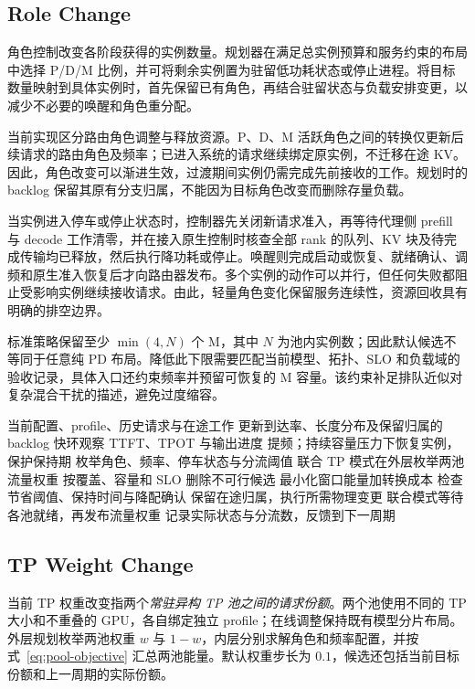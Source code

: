 \subsection{Role Change}
角色控制改变各阶段获得的实例数量。规划器在满足总实例预算和服务约束的布局中选择 P/D/M 比例，并可将剩余实例置为驻留低功耗状态或停止进程。将目标数量映射到具体实例时，首先保留已有角色，再结合驻留状态与负载安排变更，以减少不必要的唤醒和角色重分配。

当前实现区分路由角色调整与释放资源。P、D、M 活跃角色之间的转换仅更新后续请求的路由角色及频率；已进入系统的请求继续绑定原实例，不迁移在途 KV。因此，角色改变可以渐进生效，过渡期间实例仍需完成先前接收的工作。规划时的 backlog 保留其原有分支归属，不能因为目标角色改变而删除存量负载。

当实例进入停车或停止状态时，控制器先关闭新请求准入，再等待代理侧 prefill 与 decode 工作清零，并在接入原生控制时核查全部 rank 的队列、KV 块及待完成传输均已释放，然后执行降功耗或停止。唤醒则完成启动或恢复、就绪确认、调频和原生准入恢复后才向路由器发布。多个实例的动作可以并行，但任何失败都阻止受影响实例继续接收请求。由此，轻量角色变化保留服务连续性，资源回收具有明确的排空边界。

标准策略保留至少 $\min(4,N)$ 个 M，其中 $N$ 为池内实例数；因此默认候选不等同于任意纯 PD 布局。降低此下限需要匹配当前模型、拓扑、SLO 和负载域的验收记录，具体入口还约束频率并预留可恢复的 M 容量。该约束补足排队近似对复杂混合干扰的描述，避免过度缩容。

\begin{algorithm}[t]
\caption{自适应池配置的控制流程}
\label{alg:adapt}
\small
\begin{algorithmic}[1]
\Require 当前配置、profile、历史请求与在途工作
\State 更新到达率、长度分布及保留归属的 backlog
\State 快环观察 TTFT、TPOT 与输出进度
  \State 提频；持续容量压力下恢复实例，保护保持期
\EndIf
{}
  \State 枚举角色、频率、停车状态与分流阈值
  \State 联合 TP 模式在外层枚举两池流量权重
  \State 按覆盖、容量和 SLO 删除不可行候选
  \State 最小化窗口能量加转换成本
  \State 检查节省阈值、保持时间与降配确认
  \State 保留在途归属，执行所需物理变更
  \State 联合模式等待各池就绪，再发布流量权重
\EndIf
\State 记录实际状态与分流数，反馈到下一周期
\end{algorithmic}
\end{algorithm}

\subsection{TP Weight Change}
当前 TP 权重改变指两个\emph{常驻异构 TP 池之间的请求份额}。两个池使用不同的 TP 大小和不重叠的 GPU，各自绑定独立 profile；在线调整保持既有模型分片布局。外层规划枚举两池权重 $w$ 与 $1-w$，内层分别求解角色和频率配置，并按式~\eqref{eq:pool-objective} 汇总两池能量。默认权重步长为 $0.1$，候选还包括当前目标份额和上一周期的实际份额。


